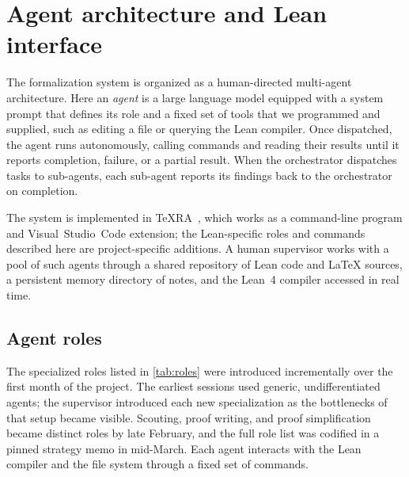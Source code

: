 \appendix

\section{Agent architecture and Lean interface}\label{app:architecture}

The formalization system is organized as a human-directed multi-agent architecture. Here an \emph{agent} is a large language model equipped with a system prompt that defines its role and a fixed set of tools that we programmed and supplied, such as editing a file or querying the Lean compiler. Once dispatched, the agent runs autonomously, calling commands and reading their results until it reports completion, failure, or a partial result. When the orchestrator dispatches tasks to sub-agents, each sub-agent reports its findings back to the orchestrator on completion.


The system is implemented in TeXRA~\cite{TeXRA}, which works as a command-line program and Visual~Studio~Code extension; the Lean-specific roles and commands described here are project-specific additions.
A human supervisor works with a pool of such agents through a shared repository of Lean code and \LaTeX{} sources, a persistent memory directory of notes, and the Lean~4 compiler accessed in real time.

\subsection{Agent roles}\label{sec:roles}

The specialized roles listed in \cref{tab:roles} were introduced incrementally over the first month of the project. The earliest sessions used generic, undifferentiated agents; the supervisor introduced each new specialization as the bottlenecks of that setup became visible.
Scouting, proof writing, and proof simplification became distinct roles by late February, and the full role list was codified in a pinned strategy memo in mid-March.
Each agent interacts with the Lean compiler and the file system through a fixed set of commands.

